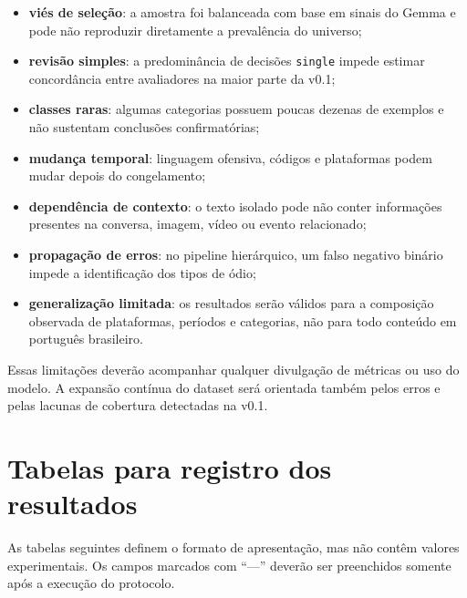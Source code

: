 \begin{itemize}
    \item \textbf{viés de seleção}: a amostra foi balanceada com base em sinais
    do Gemma e pode não reproduzir diretamente a prevalência do universo;
    \item \textbf{revisão simples}: a predominância de decisões
    \texttt{single} impede estimar concordância entre avaliadores na maior parte
    da v0.1;
    \item \textbf{classes raras}: algumas categorias possuem poucas dezenas de
    exemplos e não sustentam conclusões confirmatórias;
    \item \textbf{mudança temporal}: linguagem ofensiva, códigos e plataformas
    podem mudar depois do congelamento;
    \item \textbf{dependência de contexto}: o texto isolado pode não conter
    informações presentes na conversa, imagem, vídeo ou evento relacionado;
    \item \textbf{propagação de erros}: no pipeline hierárquico, um falso
    negativo binário impede a identificação dos tipos de ódio;
    \item \textbf{generalização limitada}: os resultados serão válidos para a
    composição observada de plataformas, períodos e categorias, não para todo
    conteúdo em português brasileiro.
\end{itemize}

Essas limitações deverão acompanhar qualquer divulgação de métricas ou uso do
modelo. A expansão contínua do dataset será orientada também pelos erros e pelas
lacunas de cobertura detectadas na v0.1.

\section{Tabelas para registro dos resultados}
\label{sec:tabelas-resultados}

As tabelas seguintes definem o formato de apresentação, mas não contêm valores
experimentais. Os campos marcados com ``---'' deverão ser preenchidos somente
após a execução do protocolo.

